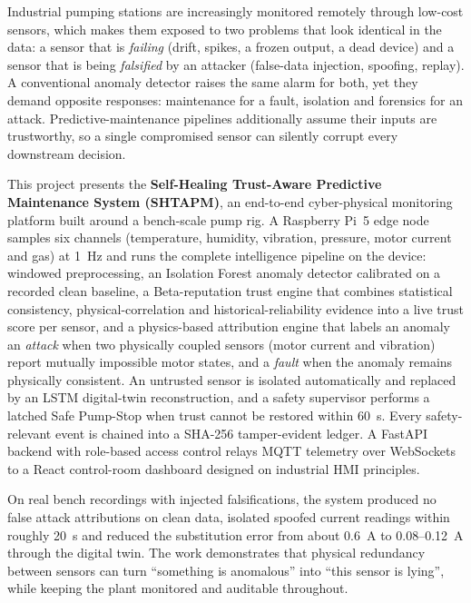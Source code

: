 Industrial pumping stations are increasingly monitored remotely through low-cost sensors, which makes them exposed to two problems that look identical in the data: a sensor that is \emph{failing} (drift, spikes, a frozen output, a dead device) and a sensor that is being \emph{falsified} by an attacker (false-data injection, spoofing, replay). A conventional anomaly detector raises the same alarm for both, yet they demand opposite responses: maintenance for a fault, isolation and forensics for an attack. Predictive-maintenance pipelines additionally assume their inputs are trustworthy, so a single compromised sensor can silently corrupt every downstream decision.

This project presents the \textbf{Self-Healing Trust-Aware Predictive Maintenance System (SHTAPM)}, an end-to-end cyber-physical monitoring platform built around a bench-scale pump rig. A Raspberry Pi~5 edge node samples six channels (temperature, humidity, vibration, pressure, motor current and gas) at 1~Hz and runs the complete intelligence pipeline on the device: windowed preprocessing, an Isolation Forest anomaly detector calibrated on a recorded clean baseline, a Beta-reputation trust engine that combines statistical consistency, physical-correlation and historical-reliability evidence into a live trust score per sensor, and a physics-based attribution engine that labels an anomaly an \emph{attack} when two physically coupled sensors (motor current and vibration) report mutually impossible motor states, and a \emph{fault} when the anomaly remains physically consistent. An untrusted sensor is isolated automatically and replaced by an LSTM digital-twin reconstruction, and a safety supervisor performs a latched Safe Pump-Stop when trust cannot be restored within 60~s. Every safety-relevant event is chained into a SHA-256 tamper-evident ledger. A FastAPI backend with role-based access control relays MQTT telemetry over WebSockets to a React control-room dashboard designed on industrial HMI principles.

On real bench recordings with injected falsifications, the system produced no false attack attributions on clean data, isolated spoofed current readings within roughly 20~s and reduced the substitution error from about 0.6~A to 0.08--0.12~A through the digital twin. The work demonstrates that physical redundancy between sensors can turn ``something is anomalous'' into ``this sensor is lying'', while keeping the plant monitored and auditable throughout.
